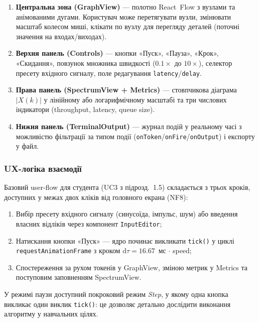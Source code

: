 \begin{enumerate}
  \item \textbf{Центральна зона (GraphView)} --- полотно React~Flow
        з вузлами та анімованими дугами. Користувач може перетягувати
        вузли, змінювати масштаб колесом миші, клікати по вузлу для
        перегляду деталей (поточні значення на входах/виходах).
  \item \textbf{Верхня панель (Controls)} --- кнопки «Пуск», «Пауза»,
        «Крок», «Скидання», повзунок множника швидкості ($0.1\times$
        до $10\times$), селектор пресету вхідного сигналу, поле
        редагування \texttt{latency}/\texttt{delay}.
  \item \textbf{Права панель (SpectrumView + Metrics)} --- стовпчикова
        діаграма $|X(k)|$ у лінійному або логарифмічному масштабі та
        три числових індикатори (throughput, latency, queue size).
  \item \textbf{Нижня панель (TerminalOutput)} --- журнал подій у
        реальному часі з можливістю фільтрації за типом події
        (\texttt{onToken}/\texttt{onFire}/\texttt{onOutput}) і
        експорту у файл.
\end{enumerate}

\subsubsection*{UX-логіка взаємодії}

Базовий user-flow для студента (UC3 з підрозд.~1.5) складається з
трьох кроків, доступних у межах двох кліків від головного екрана
(NF8):

\begin{enumerate}
  \item Вибір пресету вхідного сигналу (синусоїда, імпульс, шум)
        або введення власних відліків через компонент
        \texttt{InputEditor};
  \item Натискання кнопки «Пуск» --- ядро починає викликати
        \texttt{tick()} у циклі \texttt{requestAnimationFrame}
        з кроком $\mathrm{d}\tau = 16.67$~мс $\cdot$ speed;
  \item Спостереження за рухом токенів у GraphView, зміною метрик у
        Metrics та поступовим заповненням SpectrumView.
\end{enumerate}

У режимі паузи доступний покроковий режим \emph{Step}, у якому одна
кнопка викликає один виклик \texttt{tick()}: це дозволяє детально
дослідити виконання алгоритму у навчальних цілях.

